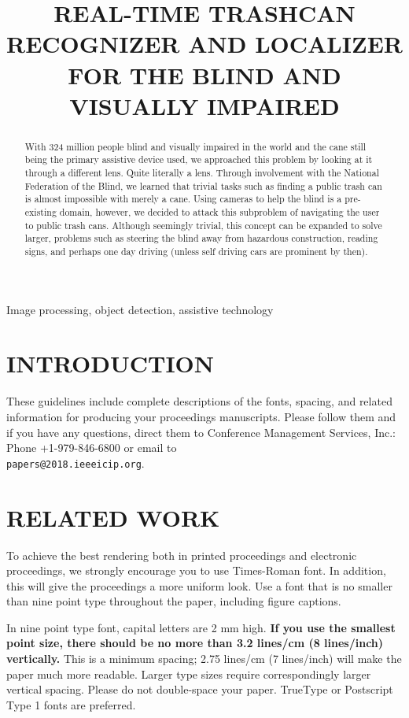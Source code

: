 \documentclass{article}
\title{REAL-TIME TRASHCAN RECOGNIZER AND LOCALIZER FOR THE BLIND AND VISUALLY IMPAIRED}
\begin{document}
%
\maketitle
%
\begin{abstract}
With 324 million people blind and visually impaired in the world and the cane still being the primary assistive device used, we approached this problem by looking at it through a different lens. Quite literally a lens. Through involvement with the National Federation of the Blind, we learned that trivial tasks such as finding a public trash can is almost impossible with merely a cane. Using cameras to help the blind is a pre-existing domain, however, we decided to attack this subproblem of navigating the user to public trash cans. Although seemingly trivial, this concept can be expanded to solve larger, problems such as steering the blind away from hazardous construction, reading signs, and perhaps one day driving (unless self driving cars are prominent by then).
\end{abstract}
%
\begin{keywords}
Image processing, object detection, assistive technology
\end{keywords}
%
\section{INTRODUCTION}
\label{sec:intro}

These guidelines include complete descriptions of the fonts, spacing, and
related information for producing your proceedings manuscripts. Please follow
them and if you have any questions, direct them to Conference Management
Services, Inc.: Phone +1-979-846-6800 or email
to \\\texttt{papers@2018.ieeeicip.org}.


\section{RELATED WORK}
\label{sec:research}

To achieve the best rendering both in printed proceedings and electronic proceedings, we
strongly encourage you to use Times-Roman font.  In addition, this will give
the proceedings a more uniform look.  Use a font that is no smaller than nine
point type throughout the paper, including figure captions.

In nine point type font, capital letters are 2 mm high.  {\bf If you use the
smallest point size, there should be no more than 3.2 lines/cm (8 lines/inch)
vertically.}  This is a minimum spacing; 2.75 lines/cm (7 lines/inch) will make
the paper much more readable.  Larger type sizes require correspondingly larger
vertical spacing.  Please do not double-space your paper.  TrueType or
Postscript Type 1 fonts are preferred.
\end{document}
